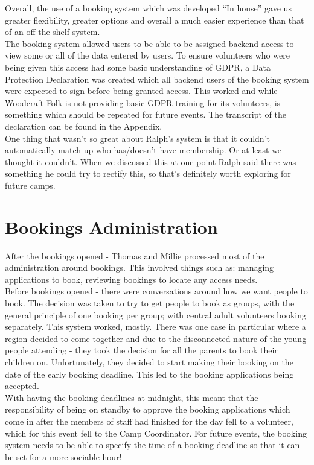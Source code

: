 Overall, the use of a booking system which was developed ``In house'' gave us greater flexibility, greater options and overall a much easier experience than that of an off the shelf system. \\

The booking system allowed users to be able to be assigned backend access to view some or all of the data entered by users. To ensure volunteers who were being given this access had some basic understanding of GDPR, a Data Protection Declaration was created which all backend users of the booking system were expected to sign before being granted access. This worked and while Woodcraft Folk is not providing basic GDPR training for its volunteers, is something which should be repeated for future events. The transcript of the declaration can be found in the Appendix.\\

One thing that wasn't so great about Ralph's system is that it couldn't automatically match up who has/doesn't have membership. Or at least we thought it couldn't. When we discussed this at one point Ralph said there was something he could try to rectify this, so that's definitely worth exploring for future camps.

\section{Bookings Administration}
After the bookings opened - Thomas and Millie processed most of the administration around bookings. This involved things such as: managing applications to book, reviewing bookings to locate any access needs.\\

Before bookings opened - there were conversations around how we want people to book. The decision was taken to try to get people to book as groups, with the general principle of one booking per group; with central adult volunteers booking separately.
This system worked, mostly. There was one case in particular where a region decided to come together and due to the disconnected nature of the young people attending - they took the decision for all the parents to book their children on. Unfortunately, they decided to start making their booking on the date of the early booking deadline. This led to the booking applications being accepted.\\

With having the booking deadlines at midnight, this meant that the responsibility of being on standby to approve the booking applications which come in after the members of staff had finished for the day fell to a volunteer, which for this event fell to the Camp Coordinator. For future events, the booking system needs to be able to specify the time of a booking deadline so that it can be set for a more sociable hour! \\

